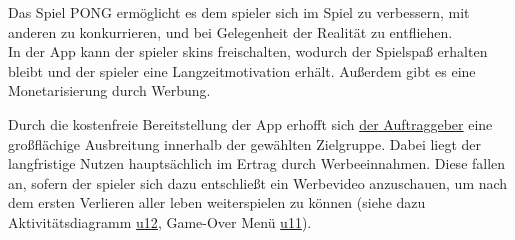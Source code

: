 Das Spiel PONG ermöglicht es dem \gls{spieler} sich im Spiel zu verbessern, mit anderen zu konkurrieren, und bei Gelegenheit der Realität zu entfliehen.
\\
In der App kann der \gls{spieler} \glspl{skin} freischalten, wodurch der Spielspaß erhalten bleibt und der \gls{spieler} eine Langzeitmotivation erhält. Außerdem gibt es eine Monetarisierung durch Werbung.

Durch die kostenfreie Bereitstellung der App erhofft sich \hyperref[sec:auftraggeber]{der Auftraggeber} eine großflächige
Ausbreitung innerhalb der gewählten Zielgruppe. Dabei liegt der langfristige Nutzen hauptsächlich im Ertrag durch Werbeeinnahmen.
Diese fallen an, sofern der \gls{spieler} sich dazu entschließt ein Werbevideo anzuschauen, um nach dem ersten Verlieren aller \gls{leben} weiterspielen zu können (siehe dazu Aktivitätsdiagramm \hyperref[fig:dia:ads]{u12}, Game-Over Menü \hyperref[subsec:u11-gameOverMenu]{u11}).
